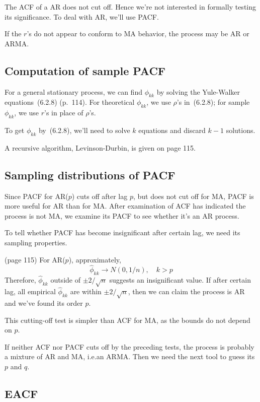 \documentclass[12pt]{article}
\begin{document}
\alert
The ACF of a AR does not cut off.
Hence we're not interested in formally testing its significance.
To deal with AR, we'll use PACF.

If the $r$'s do not appear to conform to MA behavior,
the process may be AR or ARMA.


\subsection{Computation of sample PACF}

For a general stationary process,
we can find $\phi_{kk}$ by solving
the Yule-Walker equations~(6.2.8) (p.~114).
For theoretical $\phi_{kk}$, we use $\rho$'s in~(6.2.8);
for sample $\phi_{kk}$, we use $r$'s in place of $\rho$'s.

\alert
To get $\phi_{kk}$ by~(6.2.8),
we'll need to solve $k$ equations and discard
$k-1$ solutions.

A recursive algorithm, Levinson-Durbin,
is given on page 115.

\subsection{Sampling distributions of PACF}

Since PACF for AR($p$) cuts off after lag $p$,
but does not cut off for MA,
PACF is more useful for AR than for MA.
After examination of ACF has indicated the process is not MA,
we examine its PACF to see whether it's an AR process.

To tell whether PACF has become insignificant
after certain lag, we need its sampling properties.

\theorem
(page 115) For AR($p$), approximately,
\[
\hat{\phi}_{kk} \to N(0, 1/n),\quad
k > p
\]
Therefore,
$\hat{\phi}_{kk}$ outside of $\pm 2/\sqrt{n}$ suggests
an insignificant value.
If after certain lag,
all empirical $\hat{\phi}_{kk}$ are within $\pm 2/\sqrt{n}$,
then we can claim the process is AR and we've found its order $p$.

\alert
This cutting-off test is simpler than ACF for MA,
as the bounds do not depend on $p$.

If neither ACF nor PACF cuts off by the preceding tests,
the process is probably a mixture of AR and MA,
i.e.\@ an ARMA.
Then we need the next tool to guess its
$p$ and $q$.


\subsection{EACF}
\end{document}
